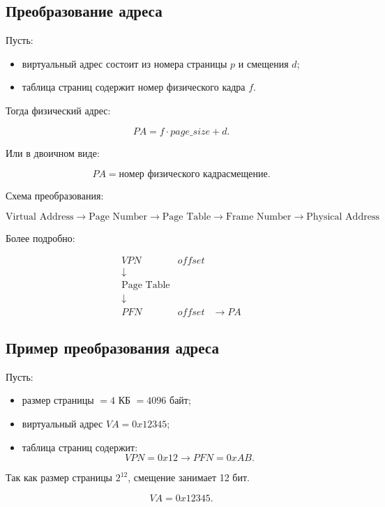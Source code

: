 \documentclass[12pt,a4paper]{article}
\theoremstyle{remark}
\begin{document}
\subsection{Преобразование адреса}

Пусть:
\begin{itemize}
    \item виртуальный адрес состоит из номера страницы $p$ и смещения $d$;
    \item таблица страниц содержит номер физического кадра $f$.
\end{itemize}

Тогда физический адрес:

\[
PA = f \cdot page\_size + d.
\]

Или в двоичном виде:

\[
PA = \boxed{\text{номер физического кадра}}
\boxed{\text{смещение}}.
\]

Схема преобразования:

\[
\boxed{\text{Virtual Address}}
\rightarrow
\boxed{\text{Page Number}}
\rightarrow
\boxed{\text{Page Table}}
\rightarrow
\boxed{\text{Frame Number}}
\rightarrow
\boxed{\text{Physical Address}}
\]

Более подробно:

\[
\begin{array}{ccc}
\boxed{VPN} & \boxed{offset} & \\
\downarrow & & \\
\boxed{\text{Page Table}} & & \\
\downarrow & & \\
\boxed{PFN} & \boxed{offset} & \longrightarrow \boxed{PA}
\end{array}
\]

\subsection{Пример преобразования адреса}

Пусть:
\begin{itemize}
    \item размер страницы $= 4$ КБ $= 4096$ байт;
    \item виртуальный адрес $VA = 0x12345$;
    \item таблица страниц содержит:
    \[
    VPN = 0x12 \longrightarrow PFN = 0xAB.
    \]
\end{itemize}

Так как размер страницы $2^{12}$, смещение занимает 12 бит.

\[
VA = 0x12345.
\]
\end{document}
